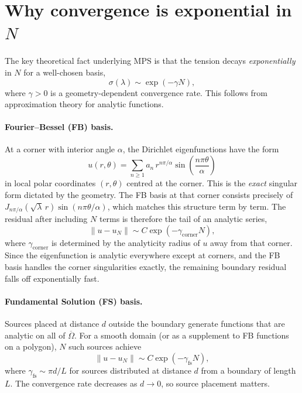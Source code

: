 \documentclass[11pt]{article}
\begin{document}
\section{Why convergence is exponential in \texorpdfstring{$N$}{N}}

The key theoretical fact underlying MPS is that the tension decays
\emph{exponentially} in $N$ for a well-chosen basis,
\begin{equation}\label{eq:exp_conv}
  \sigma(\lambda) \sim \exp(-\gamma N),
\end{equation}
where $\gamma>0$ is a geometry-dependent convergence rate.  This follows from
approximation theory for analytic functions.

\paragraph{Fourier--Bessel (FB) basis.}
At a corner with interior angle $\alpha$, the Dirichlet eigenfunctions have the
form
\begin{equation}\label{eq:fb_expansion}
  u(r,\theta) = \sum_{n\geq 1} a_n\, r^{n\pi/\alpha}\sin\!\left(\frac{n\pi\theta}{\alpha}\right)
\end{equation}
in local polar coordinates $(r,\theta)$ centred at the corner.  This is the
\emph{exact} singular form dictated by the geometry.  The FB basis at that
corner consists precisely of $J_{n\pi/\alpha}(\sqrt{\lambda}\,r)
\sin(n\pi\theta/\alpha)$, which matches this structure term by term.  The
residual after including $N$ terms is therefore the tail of an analytic series,
\begin{equation}
  \|u - u_N\| \sim C\exp(-\gamma_{\mathrm{corner}} N),
\end{equation}
where $\gamma_{\mathrm{corner}}$ is determined by the analyticity radius of $u$
away from that corner.  Since the eigenfunction is analytic everywhere except at
corners, and the FB basis handles the corner singularities exactly, the
remaining boundary residual falls off exponentially fast.

\paragraph{Fundamental Solution (FS) basis.}
Sources placed at distance $d$ outside the boundary generate functions that are
analytic on all of $\overline\Omega$.  For a smooth domain (or as a supplement
to FB functions on a polygon), $N$ such sources achieve
\begin{equation}
  \|u - u_N\| \sim C\exp(-\gamma_{\mathrm{fs}} N),
\end{equation}
where $\gamma_{\mathrm{fs}} \sim \pi d/L$ for sources distributed at distance
$d$ from a boundary of length $L$.  The convergence rate decreases as $d\to 0$,
so source placement matters.
\end{document}

